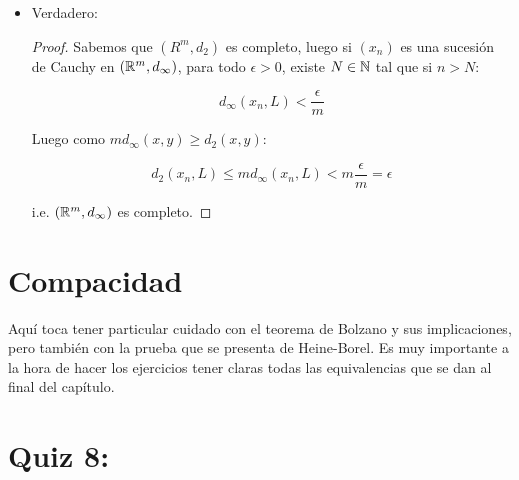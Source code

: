 \begin{itemize}[label={✎},leftmargin=*]
    \item Verdadero:\\

    \begin{proof}
        Sabemos que $(R^m,d_2)$ es completo, luego si $(x_n)$ es una sucesión de Cauchy en $(\mathbb{R}^m,d_{\infty})$, para todo $\epsilon>0$, existe $N\in \mathbb{N}$ tal que si $n>N$:

        $$d_{\infty}(x_n,L)<\frac{\epsilon}{m}$$

        Luego como $md_{\infty}(x,y)\geq d_2(x,y)$:

        $$d_{2}(x_n,L)\leq md_{\infty}(x_n,L)<m\frac{\epsilon}{m}=\epsilon$$

        i.e. $(\mathbb{R}^m,d_{\infty})$ es completo.
    \end{proof}
\end{itemize}


\section{Compacidad}

Aquí toca tener particular cuidado con el teorema de Bolzano y sus implicaciones, pero también con la prueba que se presenta de Heine-Borel. Es muy importante a la hora de hacer los ejercicios tener claras todas las equivalencias que se dan al final del capítulo.



\section{Quiz 8:}


